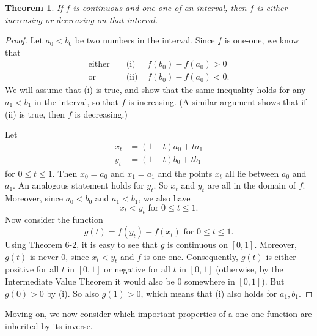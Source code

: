 \documentclass{article}
\numberwithin{corollary}{subsection}
\numberwithin{definition}{subsection}
\numberwithin{lemma}{subsection}
\newtheorem{theorem}{Theorem}
\numberwithin{theorem}{subsection}
\begin{document}
\begin{theorem}
  If $f$ is continuous and one-one of an interval, then $f$ is either
  increasing or decreasing on that interval.
\end{theorem}
\begin{proof}
  Let $a_0 < b_0$ be two numbers in the interval. Since $f$ is one-one, we know
  that
  \begin{align*}
    \text{either} &&\text{ (i) } &f(b_0) - f(a_0) > 0 \\
    \text{or} &&\text{ (ii) } &f(b_0) - f(a_0) < 0.
  \end{align*}
  We will assume that (i) is true, and show that the same inequality holds for
  any $a_1 < b_1$ in the interval, so that $f$ is increasing. (A similar
  argument shows that if (ii) is true, then $f$ is decreasing.)

  Let
  \begin{align*}
    x_t &= (1 - t)a_0 + ta_1 \\
    y_t &= (1 - t)b_0 + tb_1
  \end{align*}
  for $0 \leq t \leq 1$. Then $x_0 = a_0$ and $x_1 = a_1$ and the points $x_t$
  all lie between $a_0$ and $a_1$. An analogous statement holds for $y_t$. So
  $x_t$ and $y_t$ are all in the domain of $f$. Moreover, since $a_0 < b_0$ and
  $a_1 < b_1$, we also have \[
    x_t < y_t \text{ for } 0 \leq t \leq 1.
  \] Now consider the function \[
    g(t) = f(y_t) - f(x_t) \text{ for } 0 \leq t \leq 1.
  \] Using Theorem 6-2, it is easy to see that $g$ is continuous on $[0, 1]$.
  Moreover, $g(t)$ is never 0, since $x_t < y_t$ and $f$ is one-one.
  Consequently, $g(t)$ is either positive for all $t$ in $[0, 1]$ or negative
  for all $t$ in $[0, 1]$ (otherwise, by the Intermediate Value Theorem it
  would also be 0 somewhere in $[0, 1]$). But $g(0) > 0$ by (i). So also $g(1)
  > 0$, which means that (i) also holds for $a_1, b_1$.
\end{proof}

Moving on, we now consider which important properties of a one-one function are
inherited by its inverse.
\end{document}
